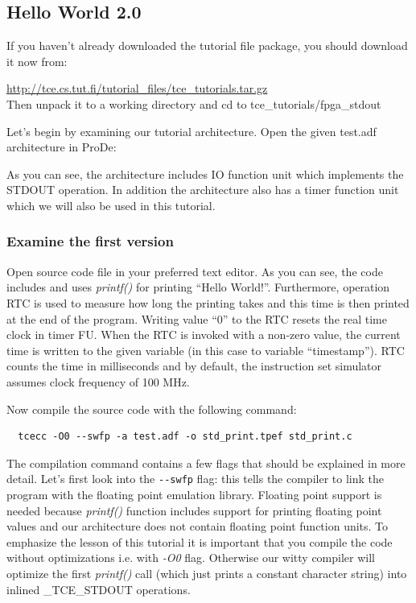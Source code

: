 \documentclass[twoside]{tceusermanual}
\begin{document}
\subsection{Hello World 2.0}

If you haven't already downloaded the tutorial file package, you should
download it now from:

\url{http://tce.cs.tut.fi/tutorial_files/tce_tutorials.tar.gz}\\

Then unpack it to a working directory and cd to tce\_tutorials/fpga\_stdout

Let's begin by examining our tutorial architecture. Open the given test.adf
architecture in ProDe:


As you can see, the architecture includes IO function unit which implements the
STDOUT operation. In addition the architecture also has a timer function unit
which we will also be used in this tutorial.

\subsubsection{Examine the first version}

Open source code file  in your preferred text
editor. As you can see, the code includes  and uses
\textit{printf()} for printing ``Hello World!''. Furthermore,
operation RTC is used to measure how long the printing takes and this
time is then printed at the end of the program. Writing value ``0'' to
the RTC resets the real time clock in timer FU. When the RTC is
invoked with a non-zero value, the current time is written to the
given variable (in this case to variable ``timestamp''). RTC counts
the time in milliseconds and by default, the instruction set simulator
assumes clock frequency of 100 MHz.

Now compile the source code with the following command:

\begin{verbatim}
  tcecc -O0 --swfp -a test.adf -o std_print.tpef std_print.c
\end{verbatim}

The compilation command contains a few flags that should be explained
in more detail. Let's first look into the \verb|--swfp| flag: this
tells the compiler to link the program with the floating point
emulation library. Floating point support is needed because
\textit{printf()} function includes support for printing floating
point values and our architecture does not contain floating point
function units. To emphasize the lesson of this tutorial it is
important that you compile the code without optimizations i.e. with
\textit{-O0} flag. Otherwise our witty compiler will optimize the
first \textit{printf()} call (which just prints a constant character
string) into inlined \_TCE\_STDOUT operations.
\end{document}
